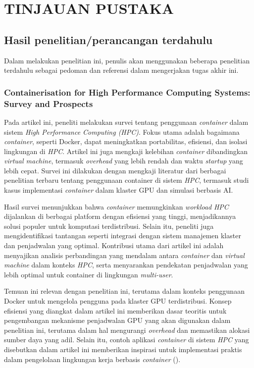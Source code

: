 \chapter{TINJAUAN PUSTAKA}

\renewcommand{\arraystretch}{1.3} %

\section{Hasil penelitian/perancangan terdahulu}
Dalam melakukan penelitian ini, penulis akan menggunakan beberapa penelitian terdahulu sebagai pedoman dan referensi dalam mengerjakan tugas akhir ini. 

\subsection{Containerisation for High Performance Computing Systems: Survey and Prospects}

Pada artikel ini, peneliti melakukan survei tentang penggunaan \emph{container} dalam sistem \textit{High Performance Computing (HPC)}. Fokus utama adalah bagaimana \emph{container}, seperti Docker, dapat meningkatkan portabilitas, efisiensi, dan isolasi lingkungan di \textit{HPC}. Artikel ini juga mengkaji kelebihan \emph{container} dibandingkan \emph{virtual machine}, termasuk \emph{overhead} yang lebih rendah dan waktu \emph{startup} yang lebih cepat. Survei ini dilakukan dengan mengkaji literatur dari berbagai penelitian terbaru tentang penggunaan container di sistem \textit{HPC}, termasuk studi kasus implementasi \emph{container} dalam klaster GPU dan simulasi berbasis AI.

Hasil survei menunjukkan bahwa \emph{container} memungkinkan \emph{workload} \textit{HPC} dijalankan di berbagai platform dengan efisiensi yang tinggi, menjadikannya solusi populer untuk komputasi terdistribusi. Selain itu, peneliti juga mengidentifikasi tantangan seperti integrasi dengan sistem manajemen klaster dan penjadwalan yang optimal. Kontribusi utama dari artikel ini adalah menyajikan analisis perbandingan yang mendalam antara \emph{container} dan \emph{virtual machine} dalam konteks \textit{HPC}, serta menyarankan pendekatan penjadwalan yang lebih optimal untuk container di lingkungan \emph{multi-user}.

Temuan ini relevan dengan penelitian ini, terutama dalam konteks penggunaan Docker untuk mengelola pengguna pada klaster GPU terdistribusi. Konsep efisiensi yang diangkat dalam artikel ini memberikan dasar teoritis untuk pengembangan mekanisme penjadwalan GPU yang akan digunakan dalam penelitian ini, terutama dalam hal mengurangi \emph{overhead} dan memastikan alokasi sumber daya yang adil. Selain itu, contoh aplikasi \emph{container} di sistem \textit{HPC} yang disebutkan dalam artikel ini memberikan inspirasi untuk implementasi praktis dalam pengelolaan lingkungan kerja berbasis \emph{container} (\cite{zhou2022containerisation}).

